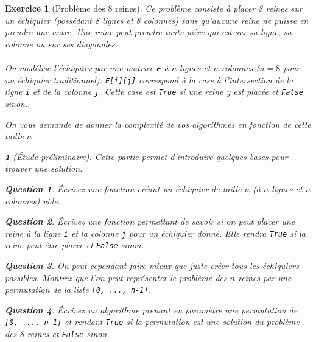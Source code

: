 \documentclass{article}
\theoremstyle{exostyle}
\newtheorem{exo}{Exercice}
\theoremstyle{partiestyle}
\newtheorem{partie}{}[exo]
\theoremstyle{questionstyle}
\newtheorem{questionpartie}{Question}[partie]
\begin{document}
\clearpage
\begin{exo}[Problème des 8 reines]

Ce problème consiste à placer 8 reines sur un échiquier (possédant 8 lignes et 8 colonnes) sans qu'aucune reine ne puisse en prendre une autre.
Une reine peut prendre toute pièce qui est sur sa ligne, sa colonne ou sur ses diagonales. 

\paragraph{}On modélise l'échiquier par une matrice \verb|E| à $n$ lignes et $n$ colonnes ($n=8$ pour un échiquier traditionnel): \verb|E[i][j]| correspond à la case à l'intersection de la ligne \verb|i| et de la colonne \verb|j|. Cette case est \verb|True| si une reine y est placée et \verb|False| sinon.

On vous demande de donner la complexité de vos algorithmes en fonction de cette taille $n$.

\begin{partie}[Étude préliminaire]
Cette partie permet d'introduire quelques bases pour trouver une solution.
\begin{questionpartie}
Écrivez une fonction créant un échiquier de taille $n$ (à $n$ lignes et $n$ colonnes) vide.
\end{questionpartie}

\begin{questionpartie}
Écrivez une fonction permettant de savoir si on peut placer une reine à la ligne \verb|i| et la colonne \verb|j| pour un échiquier donné. Elle rendra \verb|True| si la reine peut être placée et \verb|False| sinon.
\end{questionpartie}



\begin{questionpartie}
On peut cependant faire mieux que juste créer tous les échiquiers possibles. Montrez que l'on peut représenter le problème des $n$ reines par une permutation de la liste \verb|[0, ..., n-1]|.
\end{questionpartie}

\begin{questionpartie}
Écrivez un algorithme prenant en paramètre une permutation de \verb|[0, ..., n-1]| et rendant \verb|True| si la permutation est une solution du problème des 8 reines et \verb|False| sinon.
\end{questionpartie}

\end{partie}


\end{exo}
\end{document}
